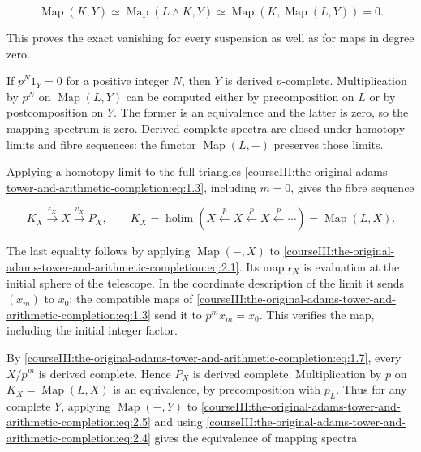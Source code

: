 \begin{equation}
\operatorname{Map}(K,Y)
\simeq\operatorname{Map}(L\wedge K,Y)
\simeq\operatorname{Map}(K,\operatorname{Map}(L,Y))=0.
\label{courseIII:the-original-adams-tower-and-arithmetic-completion:eq:2.4}
\end{equation}

This proves the exact vanishing for every suspension as well as for maps in degree zero.

If \(p^N1_Y=0\) for a positive integer \(N\), then \(Y\) is derived \(p\)-complete. Multiplication by \(p^N\) on \(\operatorname{Map}(L,Y)\) can be computed either by precomposition on \(L\) or by postcomposition on \(Y\). The former is an equivalence and the latter is zero, so the mapping spectrum is zero. Derived complete spectra are closed under homotopy limits and fibre sequences: the functor \(\operatorname{Map}(L,-)\) preserves those limits.

Applying a homotopy limit to the full triangles \eqref{courseIII:the-original-adams-tower-and-arithmetic-completion:eq:1.3}, including \(m=0\), gives the fibre sequence

\begin{equation}
K_X\xrightarrow{\epsilon_X}X\xrightarrow{v_X}P_X,
\qquad
K_X=\operatorname*{holim}(X\xleftarrow p X\xleftarrow p X\xleftarrow p\cdots)
=\operatorname{Map}(L,X).
\label{courseIII:the-original-adams-tower-and-arithmetic-completion:eq:2.5}
\end{equation}

The last equality follows by applying \(\operatorname{Map}(-,X)\) to \eqref{courseIII:the-original-adams-tower-and-arithmetic-completion:eq:2.1}. Its map \(\epsilon_X\) is evaluation at the initial sphere of the telescope. In the coordinate description of the limit it sends \((x_m)\) to \(x_0\); the compatible maps of \eqref{courseIII:the-original-adams-tower-and-arithmetic-completion:eq:1.3} send it to \(p^mx_m=x_0\). This verifies the map, including the initial integer factor.

By \eqref{courseIII:the-original-adams-tower-and-arithmetic-completion:eq:1.7}, every \(X/p^m\) is derived complete. Hence \(P_X\) is derived complete. Multiplication by \(p\) on \(K_X=\operatorname{Map}(L,X)\) is an equivalence, by precomposition with \(p_L\). Thus for any complete \(Y\), applying \(\operatorname{Map}(-,Y)\) to \eqref{courseIII:the-original-adams-tower-and-arithmetic-completion:eq:2.5} and using \eqref{courseIII:the-original-adams-tower-and-arithmetic-completion:eq:2.4} gives the equivalence of mapping spectra

